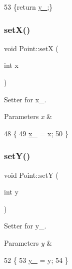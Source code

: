 \begin{DoxyCode}
53 \{\textcolor{keywordflow}{return} \mbox{\hyperlink{class_point_ae45effa2adb0036e4a770abb9b1160e6}{y\_}};\}
\end{DoxyCode}
\mbox{\label{class_point_acdc86ab607b2ae8415152883e2629015}} 
\subsubsection{\texorpdfstring{set\+X()}{setX()}}
{\footnotesize\ttfamily void Point\+::setX (\begin{DoxyParamCaption}\item[{int}]{x }\end{DoxyParamCaption})}



Setter for x\+\_\+. 


\begin{DoxyParams}{Parameters}
{\em x} & \\
\hline
\end{DoxyParams}

\begin{DoxyCode}
48                       \{
49     \mbox{\hyperlink{class_point_acfe156c55546f7e551fb54c7ea08a6cb}{x\_}} = x;
50 \}
\end{DoxyCode}
\mbox{\label{class_point_afccad787a359f062efc1af5e935a99ba}} 
\subsubsection{\texorpdfstring{set\+Y()}{setY()}}
{\footnotesize\ttfamily void Point\+::setY (\begin{DoxyParamCaption}\item[{int}]{y }\end{DoxyParamCaption})}



Setter for y\+\_\+. 


\begin{DoxyParams}{Parameters}
{\em y} & \\
\hline
\end{DoxyParams}

\begin{DoxyCode}
52                       \{
53     \mbox{\hyperlink{class_point_ae45effa2adb0036e4a770abb9b1160e6}{y\_}} = y;
54 \}
\end{DoxyCode}


